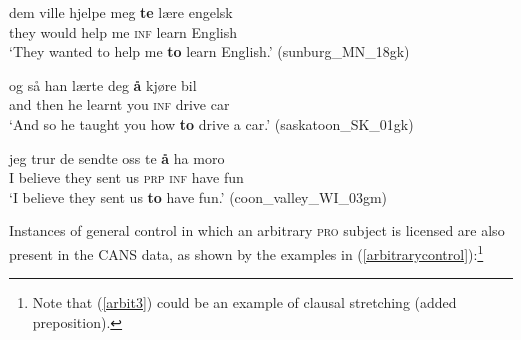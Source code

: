 \documentclass[output=paper,colorlinks,citecolor=brown]{langscibook}
\begin{document}
\begin{exe} 

\item \label{OBJcontrol}

\begin{xlist}


\item \label{OBJcontrol1} \gll dem ville hjelpe meg \textbf{te} lære engelsk \\
        they would help me \textsc{inf} learn English \\
         \glt `They wanted to help me \textbf{to} learn English.' \hfill(sunburg\_MN\_18gk)

\item \label{OBJcontrol2} \gll og så han lærte deg \textbf{{\aa}} kjøre bil \\
        and then he learnt you \textsc{inf} drive car \\
         \glt `And so he taught you how \textbf{to} drive a car.' \hfill(saskatoon\_SK\_01gk)

\item \label{OBJcontrol4} \gll jeg trur de sendte oss te \textbf{{\aa}} ha moro \\
        I believe they sent us \textsc{prp} \textsc{inf} have fun \\
         \glt `I believe they sent us \textbf{to} have fun.' \hfill(coon\_valley\_WI\_03gm)
         
                  
\end{xlist}
\end{exe}


Instances of general control in which an arbitrary \textsc{pro} subject is licensed are also present in the CANS data, as shown by the examples in (\ref{arbitrarycontrol}):\footnote{Note that (\ref{arbit3}) could be an example of clausal stretching (added preposition).} 
\end{document}
